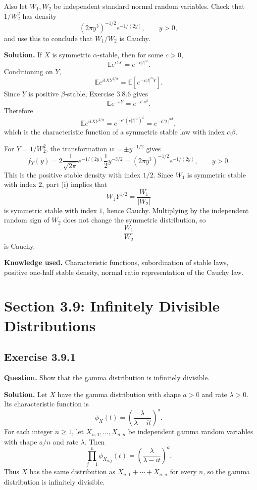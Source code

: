 \documentclass[11pt]{article}
\newcommand{\E}{\mathbb{E}}
\begin{document}
Also let $W_1,W_2$ be independent standard normal random variables.
Check that $1/W_2^2$ has density
\[
  (2\pi y^3)^{-1/2}e^{-1/(2y)},\qquad y>0,
\]
and use this to conclude that $W_1/W_2$ is Cauchy.

\textbf{Solution.}
If $X$ is symmetric $\alpha$-stable, then for some $c>0$,
\[
  \E e^{itX}=e^{-c|t|^\alpha}.
\]
Conditioning on $Y$,
\[
  \E e^{itXY^{1/\alpha}}
  =
  \E\left[e^{-c|t|^\alpha Y}\right].
\]
Since $Y$ is positive $\beta$-stable, Exercise 3.8.6 gives
\[
  \E e^{-sY}=e^{-c's^\beta}.
\]
Therefore
\[
  \E e^{itXY^{1/\alpha}}
  =
  e^{-c'(c|t|^\alpha)^\beta}
  =
  e^{-C|t|^{\alpha\beta}},
\]
which is the characteristic function of a symmetric stable law with
index $\alpha\beta$.

For $Y=1/W_2^2$, the transformation $w=\pm y^{-1/2}$ gives
\[
  f_Y(y)
  =
  2\frac{1}{\sqrt{2\pi}}e^{-1/(2y)}
  \frac{1}{2}y^{-3/2}
  =
  (2\pi y^3)^{-1/2}e^{-1/(2y)},\qquad y>0.
\]
This is the positive stable density with index $1/2$.  Since $W_1$ is
symmetric stable with index $2$, part (i) implies that
\[
  W_1Y^{1/2}=\frac{W_1}{|W_2|}
\]
is symmetric stable with index $1$, hence Cauchy.  Multiplying by the
independent random sign of $W_2$ does not change the symmetric
distribution, so
\[
  \frac{W_1}{W_2}
\]
is Cauchy.

\textbf{Knowledge used.}
Characteristic functions, subordination of stable laws, positive
one-half stable density, normal ratio representation of the Cauchy law.

\section*{Section 3.9: Infinitely Divisible Distributions}

\subsection*{Exercise 3.9.1}
\textbf{Question.}
Show that the gamma distribution is infinitely divisible.

\textbf{Solution.}
Let $X$ have the gamma distribution with shape $a>0$ and rate
$\lambda>0$.  Its characteristic function is
\[
  \phi_X(t)=\left(\frac{\lambda}{\lambda-it}\right)^a.
\]
For each integer $n\ge1$, let $X_{n,1},\ldots,X_{n,n}$ be independent
gamma random variables with shape $a/n$ and rate $\lambda$.  Then
\[
  \prod_{j=1}^n \phi_{X_{n,j}}(t)
  =
  \left(\frac{\lambda}{\lambda-it}\right)^{a}.
\]
Thus $X$ has the same distribution as
$X_{n,1}+\cdots+X_{n,n}$ for every $n$, so the gamma distribution is
infinitely divisible.
\end{document}
